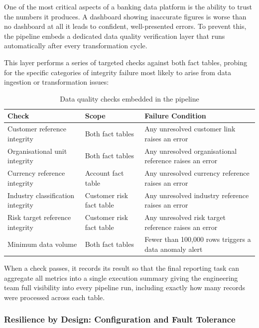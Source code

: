 One of the most critical aspects of a banking data platform is the ability to trust
the numbers it produces. A dashboard showing inaccurate figures is worse than no
dashboard at all  it leads to confident, well-presented errors. To prevent this,
the pipeline embeds a dedicated data quality verification layer that runs automatically
after every transformation cycle.

This layer performs a series of targeted checks against both fact tables, probing for
the specific categories of integrity failure most likely to arise from data ingestion
or transformation issues:

\begin{table}[H]
\centering
\small
\renewcommand{\arraystretch}{1.4}
\caption{Data quality checks embedded in the pipeline}
\label{tab:dq_checks}
\begin{tabular}{|p{4.5cm}|p{4cm}|p{5.2cm}|}
\hline
\rowcolor{blue!15}
\textbf{Check} & \textbf{Scope} & \textbf{Failure Condition} \\
\hline
Customer reference integrity & Both fact tables & Any unresolved customer link raises an error \\
\hline
Organisational unit integrity & Both fact tables & Any unresolved organisational reference raises an error \\
\hline
Currency reference integrity & Account fact table & Any unresolved currency reference raises an error \\
\hline
Industry classification integrity & Customer risk fact table & Any unresolved industry reference raises an error \\
\hline
Risk target reference integrity & Customer risk fact table & Any unresolved risk target reference raises an error \\
\hline
Minimum data volume & Both fact tables & Fewer than 100,000 rows triggers a data anomaly alert \\
\hline
\end{tabular}
\end{table}

When a check passes, it records its result so that the final reporting task can
aggregate all metrics into a single execution summary giving the engineering team
full visibility into every pipeline run, including exactly how many records were
processed across each table.

\subsubsection{Resilience by Design: Configuration and Fault Tolerance}

